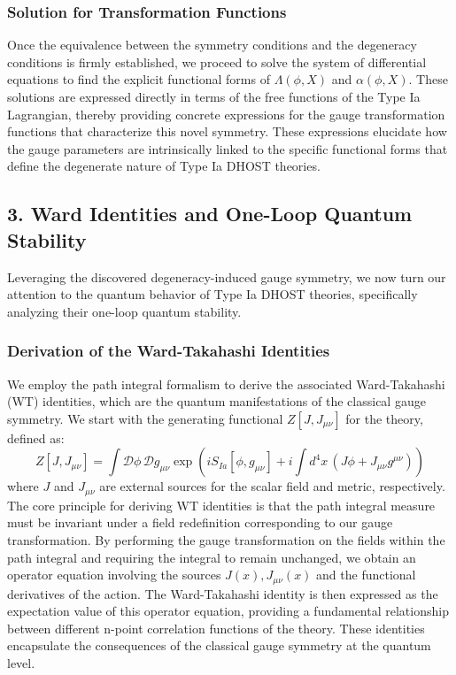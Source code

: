 \documentclass[twocolumn]{aastex631}
\begin{document}
\subsubsection*{Solution for Transformation Functions}
Once the equivalence between the symmetry conditions and the degeneracy conditions is firmly established, we proceed to solve the system of differential equations to find the explicit functional forms of $\Lambda(\phi, X)$ and $\alpha(\phi, X)$. These solutions are expressed directly in terms of the free functions of the Type Ia Lagrangian, thereby providing concrete expressions for the gauge transformation functions that characterize this novel symmetry. These expressions elucidate how the gauge parameters are intrinsically linked to the specific functional forms that define the degenerate nature of Type Ia DHOST theories.

\subsection*{3. Ward Identities and One-Loop Quantum Stability}
Leveraging the discovered degeneracy-induced gauge symmetry, we now turn our attention to the quantum behavior of Type Ia DHOST theories, specifically analyzing their one-loop quantum stability.

\subsubsection*{Derivation of the Ward-Takahashi Identities}
We employ the path integral formalism to derive the associated Ward-Takahashi (WT) identities, which are the quantum manifestations of the classical gauge symmetry. We start with the generating functional $Z[J, J_{\mu\nu}]$ for the theory, defined as:
$$Z[J, J_{\mu\nu}] = \int \mathcal{D}\phi \, \mathcal{D}g_{\mu\nu} \exp\left(iS_{Ia}[\phi, g_{\mu\nu}] + i\int d^4x \, (J\phi + J_{\mu\nu}g^{\mu\nu})\right)$$
where $J$ and $J_{\mu\nu}$ are external sources for the scalar field and metric, respectively. The core principle for deriving WT identities is that the path integral measure must be invariant under a field redefinition corresponding to our gauge transformation. By performing the gauge transformation on the fields within the path integral and requiring the integral to remain unchanged, we obtain an operator equation involving the sources $J(x), J_{\mu\nu}(x)$ and the functional derivatives of the action. The Ward-Takahashi identity is then expressed as the expectation value of this operator equation, providing a fundamental relationship between different n-point correlation functions of the theory. These identities encapsulate the consequences of the classical gauge symmetry at the quantum level.
\end{document}
